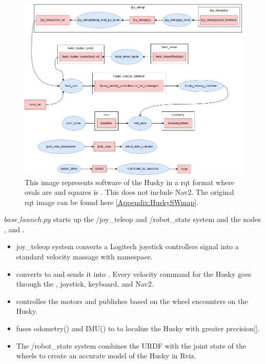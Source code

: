 \begin{figure}[H]
    \centering
    \includegraphics[width = 1\textwidth]{Figures/drawio/husky_rqt.drawio.png}
    \caption{This image represents software of the Husky in a rqt format where 
ovals are  and squares is . This does not include Nav2. The original rqt image can be found here \ref{Appendix:HuskySWmap}. }
    \label{fig:HuskySW}
\end{figure}

$base\_launch.py$ starts up the /joy\_teleop and /robot\_state system and the nodes ,  and . 

\begin{itemize}
    \item joy\_teleop system converts a Logitech joystick controllers signal into  a standard velocity massage with namespace. 
    
    \item {} converts  to  and sends it into . Every velocity command for the Husky goes through the , joystick, keyboard, and Nav2. 
    
    \item {} controlles the motors and publishes  based on the wheel encounters on the Husky. 
    
    \item {} fuses odometry() and IMU() to  to localize the Husky with greater precision[]. 
    
    \item The /robot\_state system combines the URDF with the joint state of the wheels to create an accurate model of the Husky in Rviz. 
    
\end{itemize}

